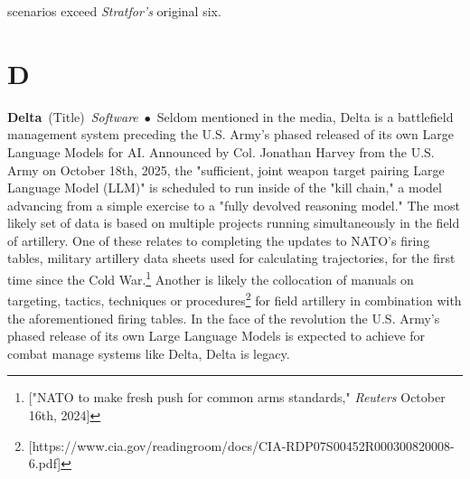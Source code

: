 \documentclass[10pt,a4paper,twoside]{article} %
\newcommand{\entry}[4]{\markboth{#1}{#1}\textbf{#1}\ {(#2)}\ \textit{#3}\ $\bullet$\ {#4}}  %
\begin{document}
\begin{multicols}{2}
{scenarios exceed \emph{Stratfor's} original six. 

}


\end{multicols}



\section*{D}

\begin{multicols}{2}

\entry{Delta} {Title} {Software} {Seldom mentioned in the media, Delta is a battlefield management system preceding the U.S. Army's phased released of its own Large Language Models for AI. Announced by Col. Jonathan Harvey from the U.S. Army on October 18th, 2025, the "sufficient, joint weapon target pairing Large Language Model (LLM)" is scheduled to run inside of the "kill chain," a model advancing from a simple exercise to a "fully devolved reasoning model." The most likely set of data is based on multiple projects running simultaneously in the field of artillery. One of these relates to completing the updates to NATO's firing tables, military artillery data sheets used for calculating trajectories, for the first time since the Cold War.\footnote{["NATO to make fresh push for common arms standards," \emph{Reuters} October 16th, 2024]} Another is likely the collocation of manuals on targeting, tactics, techniques or procedures\footnote{[https://www.cia.gov/readingroom/docs/CIA-RDP07S00452R000300820008-6.pdf]} for field artillery in combination with the aforementioned firing tables. In the face of the revolution the U.S. Army's phased release of its own Large Language Models is expected to achieve for combat manage systems like Delta, Delta is legacy. 
}
\end{multicols}
\end{document}
